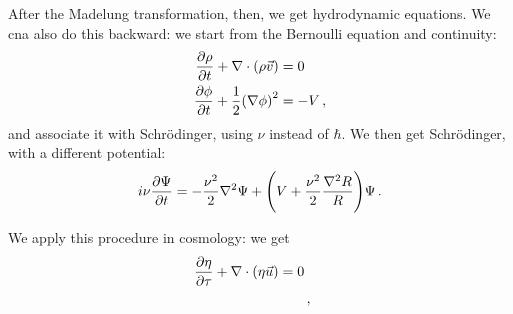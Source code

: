 \documentclass[main.tex]{subfiles}
\begin{document}
After the Madelung transformation, then, we get hydrodynamic equations. 
We cna also do this backward: we start from the Bernoulli equation and continuity: 
%
\begin{align}
\pdv{\rho }{t} + \nabla \cdot \qty(\rho \vec{v}) &= 0  \\
\pdv{\phi }{t} + \frac{1}{2} \qty(\nabla \phi )^2 &= -V 
\,,
\end{align}
%
and associate it with Schrödinger, using \(\nu \) instead of \(\hbar\). 
We then get Schrödinger, with a different potential: 
%
\begin{align}
i \nu \pdv{\Psi }{t} = - \frac{\nu^2}{2 } \nabla^2 \Psi + \qty(V + \frac{\nu^2}{2} \frac{\nabla^2 R}{R}) \Psi 
\,.
\end{align}

We apply this procedure in cosmology: we get 
%
\begin{align}
\pdv{\eta }{\tau } + \nabla \cdot \qty(\eta \vec{u}) = 0   \\
&
\,,
\end{align}
\end{document}
